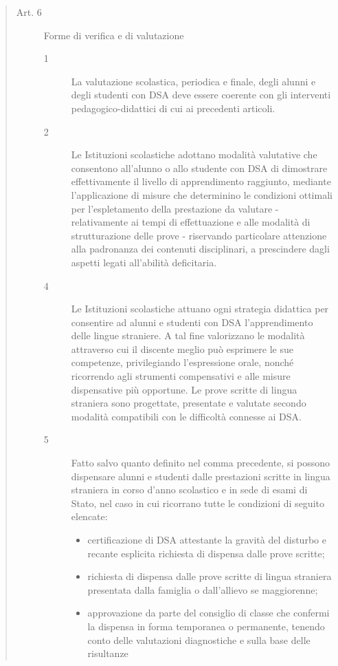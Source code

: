\begin{quote}
	\begin{description}
		\item[Art. 6] Forme di verifica e di valutazione
		\begin{description}
		\item[1] La valutazione scolastica, periodica e finale, degli alunni e degli studenti con DSA deve
		essere coerente con gli interventi pedagogico-didattici di cui ai precedenti articoli.
		\item[2] Le Istituzioni scolastiche adottano modalità valutative che consentono all'alunno o allo
		studente con DSA di dimostrare effettivamente il livello di apprendimento raggiunto,
		mediante l'applicazione di misure che determinino le condizioni ottimali per l'espletamento
		della prestazione da valutare - relativamente ai tempi di effettuazione e alle modalità di
		strutturazione delle prove - riservando particolare attenzione alla padronanza dei contenuti
		disciplinari, a prescindere dagli aspetti legati all'abilità deficitaria.
		\item[4] Le Istituzioni scolastiche attuano ogni strategia didattica per consentire ad alunni e studenti
		con DSA l'apprendimento delle lingue straniere. A tal fine valorizzano le modalità attraverso
		cui il discente meglio può esprimere le sue competenze, privilegiando l'espressione orale,
		nonché ricorrendo agli strumenti compensativi e alle misure dispensative più opportune.
		Le prove scritte di lingua straniera sono progettate, presentate e valutate secondo modalità
		compatibili con le difficoltà connesse ai DSA.
		\item[5] Fatto salvo quanto definito nel comma precedente, si possono dispensare alunni e studenti
		dalle prestazioni scritte in lingua straniera in corso d'anno scolastico e in sede di esami di
		Stato, nel caso in cui ricorrano tutte le condizioni di seguito elencate:
		\begin{itemize}
				\item certificazione di DSA attestante la gravità del disturbo e recante esplicita richiesta di
				dispensa dalle prove scritte;
				\item richiesta di dispensa dalle prove scritte di lingua straniera presentata dalla famiglia o
				dall'allievo se maggiorenne;
				\item approvazione da parte del consiglio di classe che confermi la dispensa in forma temporanea
				o permanente, tenendo conto delle valutazioni diagnostiche e sulla base delle risultanze

\end{itemize}
\end{description}
\end{description}
\end{quote}
